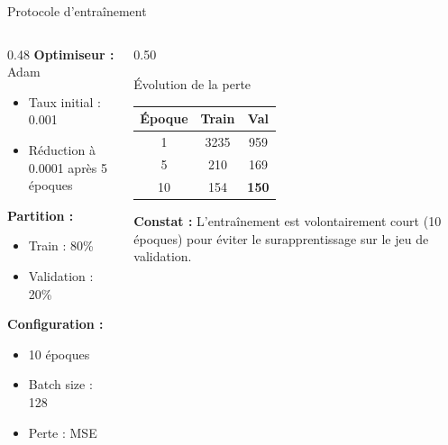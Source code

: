 \documentclass[aspectratio=169,11pt]{beamer}
\begin{document}
\begin{frame}{Protocole d'entraînement}
\begin{columns}[T]
\begin{column}{0.48\textwidth}
\textbf{Optimiseur :} Adam
\begin{itemize}
    \item Taux initial : 0.001
    \item Réduction à 0.0001 après 5 époques
\end{itemize}
\vspace{0.2cm}
\textbf{Partition :}
\begin{itemize}
    \item Train : 80\%
    \item Validation : 20\%
\end{itemize}
\vspace{0.2cm}
\textbf{Configuration :}
\begin{itemize}
    \item 10 époques
    \item Batch size : 128
    \item Perte : MSE
\end{itemize}
\end{column}
\begin{column}{0.50\textwidth}
\begin{block}{Évolution de la perte}
\centering
\small
\begin{tabular}{ccc}
\toprule
\textbf{Époque} & \textbf{Train} & \textbf{Val} \\
\midrule
1 & 3235 & 959 \\
5 & 210 & 169 \\
10 & 154 & \textbf{150} \\
\bottomrule
\end{tabular}
\end{block}
\vspace{0.2cm}
\textbf{Constat :} L'entraînement est volontairement court (10 époques) pour éviter le surapprentissage sur le jeu de validation.
\end{column}
\end{columns}
\end{frame}
\end{document}
